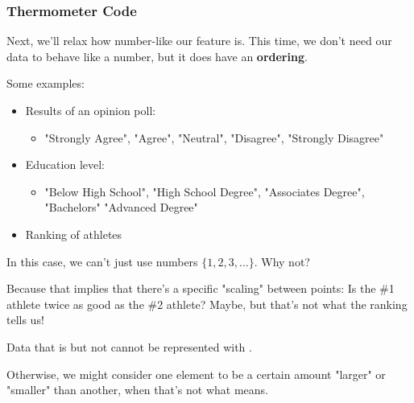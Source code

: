             \subsubsection*{Thermometer Code}

                Next, we'll relax how number-like our feature is. This time, we don't need our data to behave like a number, but it does have an \textbf{ordering}.

                Some examples:

                \begin{itemize}
                    \item Results of an opinion poll:
                        \begin{itemize}
                            \item "Strongly Agree", "Agree", "Neutral", "Disagree", "Strongly Disagree"
                        \end{itemize}
                    
                    \item Education level: 
                        \begin{itemize}
                            \item "Below High School", "High School Degree", "Associates Degree", "Bachelors" "Advanced Degree"
                        \end{itemize}
                    
                    \item Ranking of athletes
                \end{itemize}

                In this case, we can't just use numbers $\{1,2,3,...\}$. Why not?

                Because that implies that there's a specific "scaling" between points: Is the \#1 athlete twice as good as the \#2 athlete? Maybe, but that's not what the ranking tells us!\\

                \begin{concept}
                    Data that is  but not  cannot be represented with .

                    Otherwise, we might consider one element to be a certain amount "larger" or "smaller" than another, when that's not what  means.
                \end{concept}

